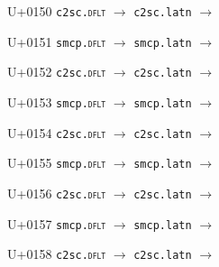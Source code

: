 \documentclass{article}
\begin{document}
\begin{substitutions}
\goodbreak

U+0150  \linebreak
    \texttt{c2sc.\textsc{dflt}} $\to$  \linebreak
    \texttt{c2sc.latn} $\to$  

\goodbreak

U+0151  \linebreak
    \texttt{smcp.\textsc{dflt}} $\to$  \linebreak
    \texttt{smcp.latn} $\to$  

\goodbreak

U+0152  \linebreak
    \texttt{c2sc.\textsc{dflt}} $\to$  \linebreak
    \texttt{c2sc.latn} $\to$  

\goodbreak

U+0153  \linebreak
    \texttt{smcp.\textsc{dflt}} $\to$  \linebreak
    \texttt{smcp.latn} $\to$  

\goodbreak

U+0154  \linebreak
    \texttt{c2sc.\textsc{dflt}} $\to$  \linebreak
    \texttt{c2sc.latn} $\to$  

\goodbreak

U+0155  \linebreak
    \texttt{smcp.\textsc{dflt}} $\to$  \linebreak
    \texttt{smcp.latn} $\to$  

\goodbreak

U+0156  \linebreak
    \texttt{c2sc.\textsc{dflt}} $\to$  \linebreak
    \texttt{c2sc.latn} $\to$  

\goodbreak

U+0157  \linebreak
    \texttt{smcp.\textsc{dflt}} $\to$  \linebreak
    \texttt{smcp.latn} $\to$  

\goodbreak

U+0158  \linebreak
    \texttt{c2sc.\textsc{dflt}} $\to$  \linebreak
    \texttt{c2sc.latn} $\to$  


\end{substitutions}
\end{document}
